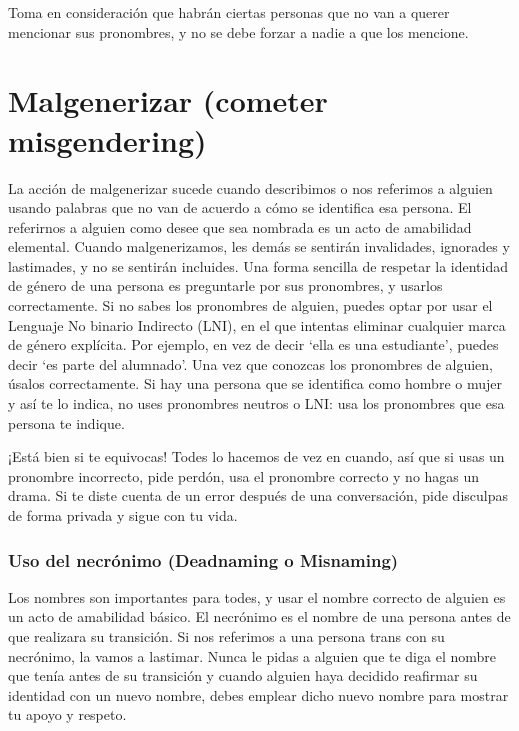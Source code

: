 \documentclass[12pt,openany]{book}
\begin{document}
Toma en consideración que habrán ciertas personas que no van a querer mencionar sus pronombres, y no se debe forzar a nadie a que los mencione.

\section*{Malgenerizar (cometer misgendering)}

La acción de malgenerizar sucede cuando describimos o nos referimos a alguien usando palabras que no van de acuerdo a cómo se identifica esa persona. El referirnos a alguien como desee que sea nombrada es un acto de amabilidad elemental. Cuando malgenerizamos, les demás se sentirán invalidades, ignorades y lastimades, y no se sentirán incluides. Una forma sencilla de respetar la identidad de género de una persona es preguntarle por sus pronombres, y usarlos correctamente. Si no sabes los pronombres de alguien, puedes optar por usar el Lenguaje No binario Indirecto (LNI), en el que intentas eliminar cualquier marca de género explícita. Por ejemplo, en vez de decir `ella es una estudiante', puedes decir `es parte del alumnado'. Una vez que conozcas los pronombres de alguien, úsalos correctamente. Si hay una persona que se identifica como hombre o mujer y así te lo indica, no uses pronombres neutros o LNI: usa los pronombres que esa persona te indique.

¡Está bien si te equivocas! Todes lo hacemos de vez en cuando, así que si usas un pronombre incorrecto, pide perdón, usa el pronombre correcto y no hagas un drama. Si te diste cuenta de un error después de una conversación, pide disculpas de forma privada y sigue con tu vida.

\subsubsection*{Uso del necrónimo (Deadnaming o Misnaming)}

Los nombres son importantes para todes, y usar el nombre correcto de alguien es un acto de amabilidad básico. El necrónimo es el nombre de una persona antes de que realizara su transición. Si nos referimos a una persona trans con su necrónimo, la vamos a lastimar. Nunca le pidas a alguien que te diga el nombre que tenía antes de su transición y cuando alguien haya decidido reafirmar su identidad con un nuevo nombre, debes emplear dicho nuevo nombre para mostrar tu apoyo y respeto.
\end{document}
